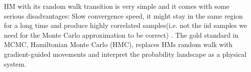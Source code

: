 HM with its random walk transition is very simple and it comes with some serious disadvantages: Slow
convergence speed, it might stay in the same region for a long time and produce highly correlated
samples(i.e. not the iid samples we need for the Monte Carlo approximation to be correct) \cite{??}.
The gold standard in MCMC, Hamiltonian Monte Carlo (HMC), replaces HMs random walk with
gradient-guided movements and interpret the probability landscape as a physical system.
 
